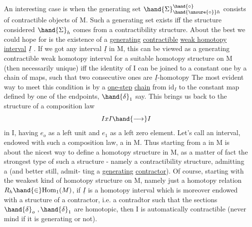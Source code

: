 An interesting case is when the generating set $\hand{\Sigma}_{\hand{\unsure{\circ}}h}^{\hand{\circ}}$ consists of
contractible objects of M.  Such a generating set exists iff the structure
considered $\hand{\Sigma}_h$ comes from a contractibility structure.  About the best we
could hope for is the existence of a  \uline{generating} \uline{contractible} 
\uline{weak homotopy interval} $\underline{I}$ .  If we got any interval $\underline{I}$ in M,  this can be
viewed as a generating contractible weak homotopy  interval
for a suitable homotopy structure on M (then necessarily unique) iff
 the identity   of I can be joined to a constant
one by a chain of maps, such that two consecutive ones are  $\underline{I}$-homotopy 
The most evident way to meet this condition is by a \uline{one-step} \uline{chain} from
$\mathrm{id}_I$ to the constant map defined by one of the endpoints, $\hand{\delta}_1$ say.  This
brings us back to the structure of a composition law
\[ IxI \hand{\longrightarrow} I \]
in I,  having $e_o$ as a left unit and $e_1$ as a left zero element.  Let's
 call an interval,  endowed with such a composition law,  a \uline{}
in M.  Thus starting from a  in M is about the nicest way to
define a homotopy structure in M,  as a matter of fact the strongest type
of such a structure  - namely a contractibility structure,  admitting a
    (and better still, admit-%
ting a \uline{generating} \uline{contractor}).  Of course,  starting with the weakest
kind of homotopy structure on M,  namely just a homotopy relation
$R_h \hand{\in} \mathrm{Hom}_1(M)$,  if $\underline{I}$ is a homotopy interval which is moreover endowed with
 a structure of a contractor,   i.e.  a contradtor such that the
 sections $\hand{\delta}_o\ ,\hand{\delta}_1$  are homotopic,  then I is automatically contractible
(never mind if it is generating or not).  

